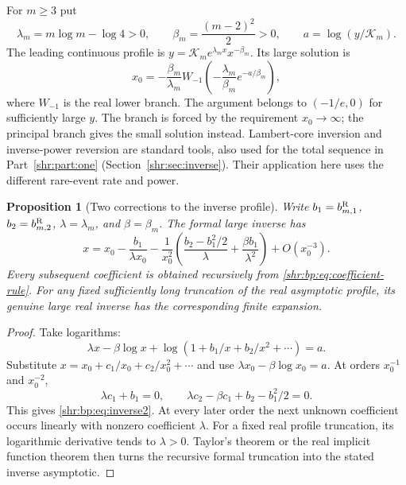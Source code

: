 \documentclass[11pt,letterpaper]{article}
\numberwithin{equation}{section}
\newtheorem{proposition}[theorem]{Proposition}
\theoremstyle{definition}
\newcommand{\1}{\mathbf 1}
\begin{document}
For $m\ge3$ put
\begin{equation}
 \lambda_m=m\log m-\log4>0,\qquad
 \beta_m=\frac{(m-2)^2}{2}>0,
 \qquad a=\log(y/\mathcal K_m).
 \label{shr:bp:eq:inverseparams}
\end{equation}
The leading continuous profile is
$y=\mathcal K_m e^{\lambda_m x}x^{-\beta_m}$. Its large solution is
\begin{equation}
 x_0=-\frac{\beta_m}{\lambda_m}
 W_{-1}\!\left(-\frac{\lambda_m}{\beta_m}e^{-a/\beta_m}\right),
 \label{shr:bp:eq:lambert}
\end{equation}
where $W_{-1}$ is the real lower branch. The argument belongs to $(-1/e,0)$
for sufficiently large $y$. The branch is forced by the requirement
$x_0\to\infty$; the principal branch gives the small solution instead.
Lambert-core inversion and inverse-power reversion are standard tools,
also used for the total sequence in Part~\ref{shr:part:one}
(Section~\ref{shr:sec:inverse}). Their application here
uses the different rare-event rate and power.

\begin{proposition}[Two corrections to the inverse profile]
\label{shr:bp:prop:inverse}
Write $b_1=b_{m,1}^{\rm R}$, $b_2=b_{m,2}^{\rm R}$,
$\lambda=\lambda_m$, and $\beta=\beta_m$. The formal large inverse has
\begin{equation}
 x=x_0-\frac{b_1}{\lambda x_0}
 -\frac{1}{x_0^2}
 \left(\frac{b_2-b_1^2/2}{\lambda}
       +\frac{\beta b_1}{\lambda^2}\right)
 +O(x_0^{-3}).
 \label{shr:bp:eq:inverse2}
\end{equation}
Every subsequent coefficient is obtained recursively from
\eqref{shr:bp:eq:coefficient-rule}. For any fixed sufficiently long truncation
of the real asymptotic profile, its genuine large real inverse has the
corresponding finite expansion.
\end{proposition}
\begin{proof}
Take logarithms:
\[
 \lambda x-\beta\log x+\log\left(1+b_1/x+b_2/x^2+\cdots\right)=a.
\]
Substitute $x=x_0+c_1/x_0+c_2/x_0^2+\cdots$ and use
$\lambda x_0-\beta\log x_0=a$. At orders $x_0^{-1}$ and $x_0^{-2}$,
\[
 \lambda c_1+b_1=0,\qquad
 \lambda c_2-\beta c_1+b_2-b_1^2/2=0.
\]
This gives \eqref{shr:bp:eq:inverse2}. At every later order the next unknown
coefficient occurs linearly with nonzero coefficient $\lambda$.
For a fixed real profile truncation, its logarithmic derivative tends to
$\lambda>0$. Taylor's theorem or the real implicit function theorem then
turns the recursive formal truncation into the stated inverse asymptotic.
\end{proof}
\end{document}
